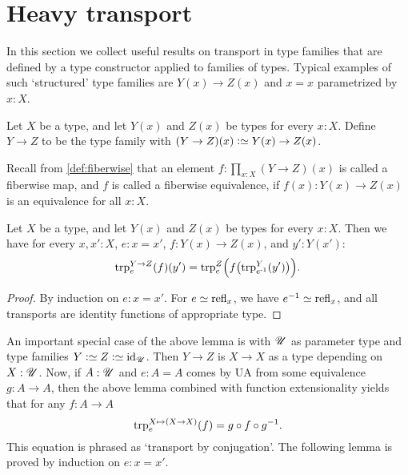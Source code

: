 \section{Heavy transport}
\label{sec:heavy-transport}

In this section we collect useful results on transport in
type families that are defined by a type constructor applied
to families of types.
Typical examples of such `structured' type families are
$Y(x)\to Z(x)$ and $x=x$ parametrized by $x:X$.

\begin{definition}\label{def:function-type-families}
Let $X$ be a type, and let $Y(x)$ and $Z(x)$ be types for every $x:X$.
Define $Y\to Z$ to be the type family
with $(Y\to Z)(x) \defeq Y(x)\to Z(x)$.
\end{definition}
Recall from \cref{def:fiberwise} that an element $f : \prod_{x:X}(Y\to Z)(x)$
is called a fiberwise map,
and $f$ is called a fiberwise equivalence,
if $f(x): Y(x)\to Z(x)$ is an equivalence for all $x:X$.

\begin{lemma}\label{lem:trp-in-function-type}
Let $X$ be a type, and let $Y(x)$ and $Z(x)$ be types for every $x:X$.
Then we have for every $x,x':X$, $e: x=x'$, $f: Y(x)\to Z(x)$, and $y':Y(x')$:
\[
\trp[Y\to Z]{ e} (f)(y') = \trp[Z]{e} \Bigl(f\bigl(\trp[Y]{ e^{-1}}(y')\bigr)\Bigr).
\]
\end{lemma}
\begin{proof}
By induction on $e: x=x'$. For $e \jdeq \refl{x}$, we have $e^{-1}\jdeq \refl{x}$,
and all transports are identity functions of appropriate type.
\end{proof}

An important special case of the above lemma is with ${\mathscr{U}}$
as parameter type and type families $Y\defeq Z\defeq \id_\UU$.
Then $Y\to Z$ is $X\to X$ as a type depending on $X:{\mathscr{U}}$. Now,
if $A:{\mathscr{U}}$ and $e: A=A$ comes by UA from some equivalence
$g:A\to A$, then the above lemma combined with function extensionality
yields that for any $f: A\to A$
\[
\trp[X \mapsto (X\to X)]{e} (f) = g\circ f \circ g^{-1}.
\]
This equation is phrased as `transport by conjugation'.
The following lemma is proved by induction on $e: x=x'$.

